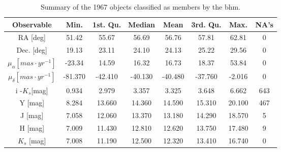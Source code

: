 \begin{table}[ht!]
\caption{Summary of the 1967 objects classified as members by the \gls{bhm}.}
\begin{center}
\begin{tabular}{|c|c|c|c|c|c|c|c|}
\hline
Observable & Min. & 1st. Qu. & Median & Mean & 3rd. Qu. & Max. & NA's \\
\hline
\hline
RA [deg]   & 51.42 &  55.67 & 56.69 &  56.76  & 57.81  & 62.81 & 0\\
Dec. [deg] &19.13  & 23.11  & 24.10 &  24.13  & 25.22 &  29.56 &0\\
$\mu_{\alpha} [mas\cdot yr^{-1}]$&-23.34  & 14.59  & 16.32 &  16.73 &  18.37  & 53.84&0\\
$\mu_{\delta} [mas\cdot yr^{-1}]$&-81.370 &-42.410& -40.130& -40.480& -37.760&  -2.016&0\\
i -$K_s$[mag] &  0.934 &  2.979  & 3.357    & 3.325   &  3.648  &6.662   &643\\
Y [mag]           &   8.284 & 13.660 & 14.360  &14.590  &15.310  &20.100 &   467 \\
J [mag]           &   7.058 & 12.060& 13.370  & 13.180 & 14.290 & 18.570&      5\\
H [mag]          &   7.009 & 11.430 & 12.810  & 12.620 & 13.750 & 17.480&      9 \\
$K_s$ [mag]  &   7.008 & 11.190 & 12.500  & 12.320 & 13.410 & 16.740&    0\\
\hline
\end{tabular}
\end{center}
\label{tab:hmps}
\end{table}%

